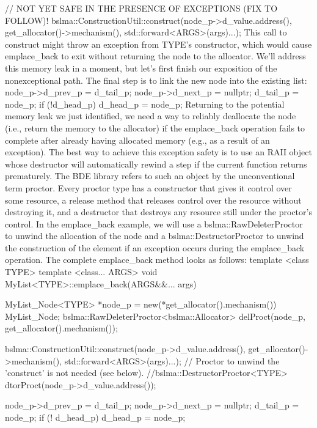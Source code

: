 {{{{{{{{{    // NOT YET SAFE IN THE PRESENCE OF EXCEPTIONS (FIX TO FOLLOW)!
    bslma::ConstructionUtil::construct(node_p->d_value.address(),
                                       get_allocator()->mechanism(),
                                       std::forward<ARGS>(args)...);
This call to construct might throw an exception from TYPE’s constructor, which would cause emplace_back to exit without returning the node to the allocator. We’ll address this memory leak in a moment, but let’s first finish our exposition of the nonexceptional path.
The final step is to link the new node into the existing list:
    node_p->d_prev_p = d_tail_p;
    node_p->d_next_p = nullptr;
    d_tail_p = node_p;
    if (!d_head_p) {
        d_head_p = node_p;
    }
}
Returning to the potential memory leak we just identified, we need a way to reliably deallocate the node (i.e., return the memory to the allocator) if the emplace_back operation fails to complete after already having allocated memory (e.g., as a result of an exception). The best way to achieve this exception safety is to use an RAII  object whose destructor will automatically rewind a step if the current function returns prematurely. The BDE library refers to such an object by the unconventional term proctor. Every proctor type has a constructor that gives it control over some resource, a release method that releases control over the resource without destroying it, and a destructor that destroys any resource still under the proctor’s control. In the emplace_back example, we will use a bslma::RawDeleterProctor to unwind the allocation of the node and a bslma::DestructorProctor to unwind the construction of the element if an exception occurs during the emplace_back operation.  The complete emplace_back method looks as follows:
template <class TYPE>
template <class... ARGS>
void MyList<TYPE>::emplace_back(ARGS&&... args)
{
    MyList_Node<TYPE> *node_p =
        new(*get_allocator().mechanism()) MyList_Node;
    bslma::RawDeleterProctor<bslma::Allocator> delProct(node_p,
                                             get_allocator().mechanism());

    bslma::ConstructionUtil::construct(node_p->d_value.address(),
                                       get_allocator()->mechanism(),
                                       std::forward<ARGS>(args)...);
    // Proctor to unwind the 'construct' is not needed (see below).
    //bslma::DestructorProctor<TYPE> dtorProct(node_p->d_value.address());

    node_p->d_prev_p = d_tail_p;
    node_p->d_next_p = nullptr;
    d_tail_p = node_p;
    if (! d_head_p) {
        d_head_p = node_p;
    }

}}}}}}}}}

